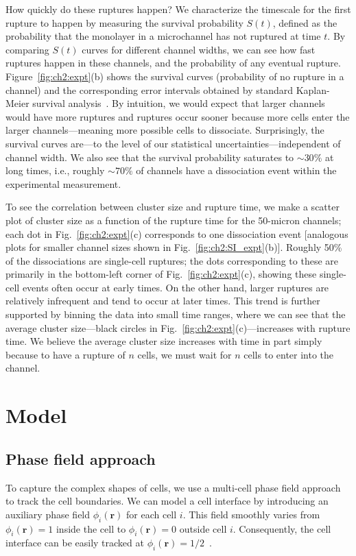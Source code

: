 How quickly do these ruptures happen?
We characterize the timescale for the first rupture to happen by measuring the survival probability $S(t)$, defined as the probability that the monolayer in a microchannel has not ruptured at time $t$.
By comparing $S(t)$ curves for different channel widths, we can see how fast ruptures happen in these channels, and the probability of any eventual rupture.
Figure~\ref{fig:ch2:expt}(b) shows the survival curves (probability of no rupture in a channel) and the corresponding error intervals obtained by standard Kaplan-Meier survival analysis~\cite{kaplan1958nonparametric}.
By intuition, we would expect that larger channels would have more ruptures and ruptures occur sooner because more cells enter the larger channels---meaning more possible cells to dissociate.
Surprisingly, the survival curves are---to the level of our statistical uncertainties---independent of channel width.
We also see that the survival probability saturates to $\sim 30\%$ at long times, i.e., roughly $\sim 70\%$ of channels have a dissociation event within the experimental measurement.

To see the correlation between cluster size and rupture time, we make a scatter plot of cluster size as a function of the rupture time for the 50-micron channels; each dot in Fig.~\ref{fig:ch2:expt}(c) corresponds to one dissociation event [analogous plots for smaller channel sizes shown in Fig.~\ref{fig:ch2:SI_expt}(b)].
Roughly 50\% of the dissociations are single-cell ruptures; the dots corresponding to these are primarily in the bottom-left corner of Fig.~\ref{fig:ch2:expt}(c), showing these single-cell events often occur at early times.
On the other hand, larger ruptures are relatively infrequent and tend to occur at later times.
This trend is further supported by binning the data into small time ranges, where we can see that the average cluster size---black circles in Fig.~\ref{fig:ch2:expt}(c)---increases with rupture time.
We believe the average cluster size increases with time in part simply because to have a rupture of $n$ cells, we must wait for $n$ cells to enter into the channel.


\section{Model}
\label{sec:ch2:model}

\subsection{Phase field approach}
\label{sec:ch2:pfm}
To capture the complex shapes of cells, we use a multi-cell phase field approach~\cite{nonomura2012study, camley2014polarity, lober2015collisions, palmieri2015multiple} to track the cell boundaries.
We can model a cell interface by introducing an auxiliary phase field $\phi_i(\mathbf r)$ for each cell $i$.
This field smoothly varies from $\phi_i(\mathbf r)=1$ inside the cell to $\phi_i(\mathbf r)=0$ outside cell $i$.
Consequently, the cell interface can be easily tracked at $\phi_i(\mathbf r)=1/2$~\cite{palmieri2015multiple}.

